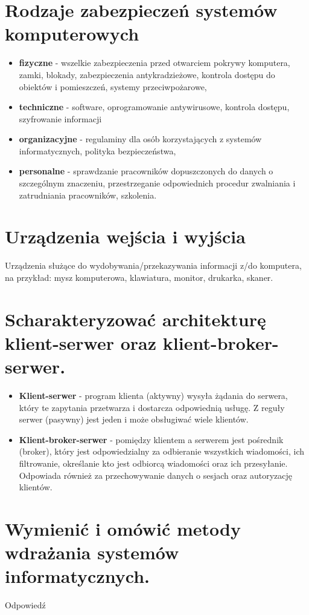 \documentclass[12pt,a4paper]{article}
\begin{document}
	\section{Rodzaje zabezpieczeń systemów komputerowych}
	\begin{itemize}
		\item \textbf{fizyczne} - wszelkie zabezpieczenia przed otwarciem pokrywy komputera, zamki, blokady, zabezpieczenia antykradzieżowe, kontrola dostępu do obiektów i pomieszczeń, systemy przeciwpożarowe,
		\item \textbf{techniczne} - software, oprogramowanie antywirusowe, kontrola dostępu, szyfrowanie informacji
		\item \textbf{organizacyjne} - regulaminy dla osób korzystających z systemów informatycznych, polityka bezpieczeństwa,
		\item \textbf{personalne} - sprawdzanie pracowników dopuszczonych do danych o szczególnym znaczeniu, przestrzeganie odpowiednich procedur zwalniania i zatrudniania pracowników, szkolenia.
	\end{itemize}

	\section{Urządzenia wejścia i wyjścia}
	Urządzenia służące do wydobywania/przekazywania informacji z/do komputera, na przykład: mysz komputerowa, klawiatura, monitor, drukarka, skaner.

	\section{Scharakteryzować architekturę klient-serwer oraz klient-broker-serwer.}
	\begin{itemize}
		\item  \textbf{Klient-serwer} - program klienta (aktywny) wysyła żądania do serwera, który te zapytania przetwarza i dostarcza odpowiednią usługę. Z reguły serwer (pasywny) jest jeden i może obsługiwać wiele klientów.
		\item \textbf{Klient-broker-serwer} - pomiędzy klientem a serwerem jest pośrednik (broker), który jest odpowiedzialny za odbieranie wszystkich wiadomości, ich filtrowanie, określanie kto jest odbiorcą wiadomości oraz ich przesyłanie. Odpowiada również za przechowywanie danych o sesjach oraz autoryzację klientów.
	\end{itemize}

	\section{Wymienić i omówić metody wdrażania systemów informatycznych.}
	Odpowiedź
\end{document}
